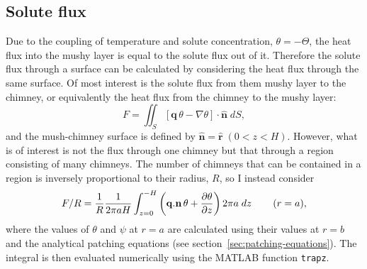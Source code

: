 \documentclass[11pt]{proc}
\begin{document}
\begin{appendices}
  \section{Solute flux} \label{app:solute-flux}
Due to the coupling of temperature and solute concentration, $\theta=-\Theta$, the heat flux into the mushy layer is equal to the solute flux out of it. Therefore the solute flux through a surface can be calculated by considering the heat flux through the same surface. Of most interest is the solute flux from them mushy layer to the chimney, or equivalently the heat flux from the chimney to the mushy layer:
\begin{equation}
F = \iint_S \left[ \mathbf{q} \, \theta - \nabla \theta \right] \cdot \mathbf{\hat{n}} \; dS,
\end{equation}
and the mush-chimney surface is defined by $\mathbf{\hat{n}} = \mathbf{\hat{r}} \; (0 < z < H) $. However, what is of interest is not the flux through one chimney but that through a region consisting of many chimneys. The number of chimneys that can be contained in a region is inversely proportional to their radius, $R$, so I instead consider
 \begin{equation}
F/R = \frac{1}{R} \frac{1}{2 \pi a H} \int_{z=0}^{-H} \left( \mathbf{q}.\mathbf{n} \, \theta + \frac{\partial \theta}{\partial z} \right) 2 \pi a \; dz \hspace{5ex} (r=a),
\end{equation}
where the values of $\theta$ and $\psi$ at $r=a$ are calculated using their values at $r=b$ and the analytical patching equations (see section~\ref{sec:patching-equations}). The integral is then evaluated numerically using the MATLAB function \texttt{trapz}.













\end{appendices}
\end{document}
